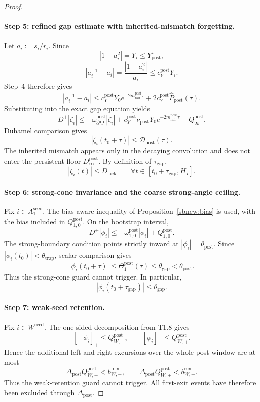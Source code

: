 \documentclass{article} %
\theoremstyle{plain}
\theoremstyle{definition}
\theoremstyle{remark}
\begin{document}
\begin{proof}
\paragraph{Step 5: refined gap estimate with inherited-mismatch forgetting.}
Let $a_i:=s_i/r_i$.  Since
\[
|1-a_i^2|=Y_i\le Y_{\mathrm{post}}^\star,
\]
\[
|a_i^{-1}-a_i|
=
\frac{|1-a_i^2|}{a_i}
\le
c_Y^{\mathrm{post}}Y_i.
\]
Step~4 therefore gives
\[
|a_i^{-1}-a_i|
\le
c_Y^{\mathrm{post}}Y_0e^{-2m_{\mathrm{rad}}^{\mathrm{post}}\tau}
+
2c_Y^{\mathrm{post}}\widehat P_{\mathrm{post}}(\tau).
\]
Substituting into the exact gap equation yields
\[
D^+|\zeta_i|
\le
-\omega_{\mathrm{gap}}^{\mathrm{post}}|\zeta_i|
+
c_Y^{\mathrm{post}}\nu_{\mathrm{post}}Y_0
e^{-2m_{\mathrm{rad}}^{\mathrm{post}}\tau}
+
Q_\infty^{\mathrm{post}}.
\]
Duhamel comparison gives
\[
\boxed{
|\zeta_i(t_0+\tau)|
\le
\mathcal D_{\mathrm{post}}(\tau).
}
\]
The inherited mismatch appears only in the decaying convolution and does not
enter the persistent floor $D_\infty^{\mathrm{post}}$.  By definition of
$\tau_{\mathrm{gap}}$,
\[
|\zeta_i(t)|\le D_{\mathrm{lock}}
\qquad
\forall t\in[t_0+\tau_{\mathrm{gap}},H_\star].
\]

\paragraph{Step 6: strong-cone invariance and the coarse strong-angle ceiling.}
Fix $i\in A_1^{\mathrm{seed}}$. The bias-aware inequality of
Proposition~\ref{sbnew:bias} is used, with the bias included in
$Q_{1,0}^{\mathrm{post}}$. On the bootstrap interval,
\[
D^+|\phi_i|
\le
-\omega_{1,0}^{\mathrm{post}}|\phi_i|
+Q_{1,0}^{\mathrm{post}}.
\]
The strong-boundary condition points strictly inward at
$|\phi_i|=\theta_{\mathrm{post}}$.  Since
$|\phi_i(t_0)|<\theta_{\mathrm{trap}}$, scalar comparison gives
\[
\boxed{
|\phi_i(t_0+\tau)|
\le
\Theta_1^{\mathrm{post}}(\tau)
\le
\theta_{\mathrm{gap}}
<
\theta_{\mathrm{post}}.
}
\]
Thus the strong-cone guard cannot trigger.  In particular,
\[
\boxed{
|\phi_i(t_0+\tau_{\mathrm{gap}})|\le\theta_{\mathrm{gap}}.
}
\]

\paragraph{Step 7: weak-seed retention.}
Fix $i\in W^{\mathrm{seed}}$.  The one-sided decomposition from T1.8 gives
\[
[-\dot\phi_i]_+\le Q_{W,-}^{\mathrm{post}},
\qquad
[\dot\phi_i]_+\le Q_{W,+}^{\mathrm{post}}.
\]
Hence the additional left and right excursions over the whole post window
are at most
\[
\Delta_{\mathrm{post}}Q_{W,-}^{\mathrm{post}}
<
b_{W,-}^{\mathrm{rem}},
\qquad
\Delta_{\mathrm{post}}Q_{W,+}^{\mathrm{post}}
<
b_{W,+}^{\mathrm{rem}}.
\]
Thus the weak-retention guard cannot trigger.  All first-exit events have
therefore been excluded through $\Delta_{\mathrm{post}}$.


\end{proof}
\end{document}
